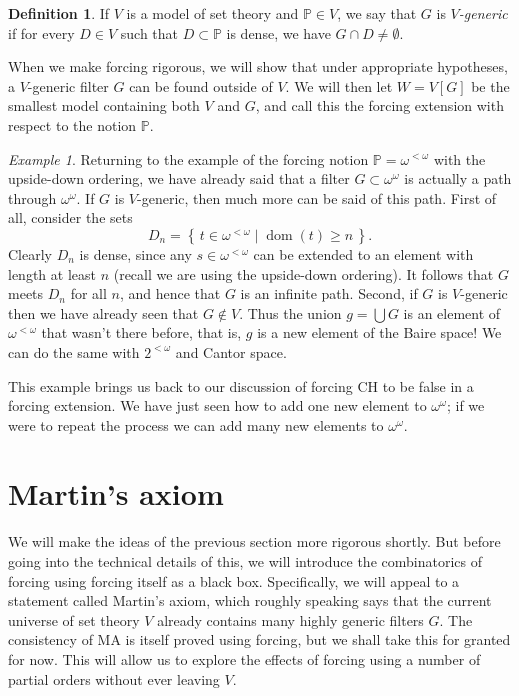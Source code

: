 \documentclass[11pt,oneside]{amsbook}
\newcommand{\set}[1]{\left\{\,#1\,\right\}}
\newcommand{\PP}{\mathbb P}
\DeclareMathOperator{\dom}{dom}
\theoremstyle{definition}
\theoremstyle{plain}
\theoremstyle{definition}
\newtheorem{defn}[thm]{Definition}
\theoremstyle{remark}
\newtheorem{example}[thm]{Example}
\begin{document}
\begin{defn}
  If $V$ is a model of set theory and $\PP\in V$, we say that $G$ is \emph{$V$-generic} if for every $D\in V$ such that $D\subset\PP$ is dense, we have $G\cap D\neq\emptyset$.
\end{defn}

When we make forcing rigorous, we will show that under appropriate hypotheses, a $V$-generic filter $G$ can be found outside of $V$. We will then let $W=V[G]$ be the smallest model containing both $V$ and $G$, and call this the forcing extension with respect to the notion $\PP$.

\begin{example}
  Returning to the example of the forcing notion $\PP=\omega^{<\omega}$ with the upside-down ordering, we have already said that a filter $G\subset\omega^\omega$ is actually a path through $\omega^\omega$. If $G$ is $V$-generic, then much more can be said of this path. First of all, consider the sets
  \[D_n=\set{t\in\omega^{<\omega}\mid \dom(t)\geq n}\text{.}
  \]
  Clearly $D_n$ is dense, since any $s\in\omega^{<\omega}$ can be extended to an element with length at least $n$ (recall we are using the upside-down ordering). It follows that $G$ meets $D_n$ for all $n$, and hence that $G$ is an infinite path. Second, if $G$ is $V$-generic then we have already seen that $G\notin V$. Thus the union $g=\bigcup G$ is an element of $\omega^{<\omega}$ that wasn't there before, that is, $g$ is a new element of the Baire space! We can do the same with $2^{<\omega}$ and Cantor space.
\end{example}

This example brings us back to our discussion of forcing CH to be false in a forcing extension. We have just seen how to add one new element to $\omega^\omega$; if we were to repeat the process we can add many new elements to $\omega^\omega$.



\section{Martin's axiom}

We will make the ideas of the previous section more rigorous shortly. But before going into the technical details of this, we will introduce the combinatorics of forcing using forcing itself as a black box. Specifically, we will appeal to a statement called Martin's axiom, which roughly speaking says that the current universe of set theory $V$ already contains many highly generic filters $G$. The consistency of MA is itself proved using forcing, but we shall take this for granted for now. This will allow us to explore the effects of forcing using a number of partial orders without ever leaving $V$.
\end{document}
